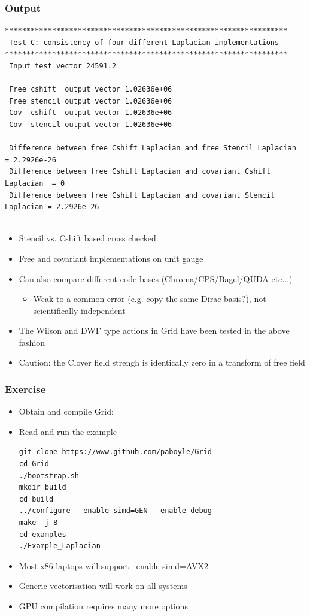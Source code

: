 \documentclass[pdf,ps,8pt]{beamer}
\begin{document}
\begin{frame}[fragile]\small\frametitle{Output}
{\tiny \begin{verbatim}
******************************************************************
 Test C: consistency of four different Laplacian implementations 
******************************************************************
 Input test vector 24591.2
--------------------------------------------------------
 Free cshift  output vector 1.02636e+06
 Free stencil output vector 1.02636e+06
 Cov  cshift  output vector 1.02636e+06
 Cov  stencil output vector 1.02636e+06
--------------------------------------------------------
 Difference between free Cshift Laplacian and free Stencil Laplacian      = 2.2926e-26
 Difference between free Cshift Laplacian and covariant Cshift Laplacian  = 0
 Difference between free Cshift Laplacian and covariant Stencil Laplacian = 2.2926e-26
--------------------------------------------------------
\end{verbatim}
}
  \begin{itemize}
  \item Stencil vs. Cshift based cross checked.
  \item Free and covariant implementations on unit gauge 
  \item Can also compare different code bases (Chroma/CPS/Bagel/QUDA etc...)
  \begin{itemize}
  \item Weak to a common error (e.g. copy the same Dirac basis?), not scientifically independent
  \end{itemize}
  \item The Wilson and DWF type actions in Grid have been tested in the above fashion
  \item Caution: the Clover field strengh is identically zero in a transform of free field
  \end{itemize}

  \end{frame}

\begin{frame}[fragile]\small\frametitle{Exercise}
\begin{itemize}
\item Obtain and compile Grid;
\item Read and run the example
\begin{verbatim}
git clone https://www.github.com/paboyle/Grid
cd Grid
./bootstrap.sh
mkdir build
cd build
../configure --enable-simd=GEN --enable-debug
make -j 8
cd examples
./Example_Laplacian
\end{verbatim}
\item Most x86 laptops will support --enable-simd=AVX2
\item Generic vectorisation will work on all systems
\item GPU compilation requires many more options
\end{itemize}
\end{frame}
\end{document}
